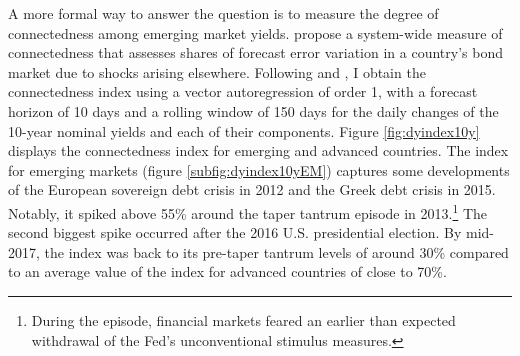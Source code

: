 {A more formal way to answer the question is to measure the degree of connectedness among emerging market yields.
\cite{DieboldYilmaz:2014} propose a system-wide measure of connectedness 
that assesses shares of forecast error variation in a country's bond market due to shocks arising elsewhere.
Following \cite{ACDM:2019} and \cite{BostanciYilmaz:2020}, I obtain the connectedness index using a vector autoregression of order 1, with a forecast horizon of 10 days and a rolling window of 150 days for the daily changes of the 10-year nominal yields 
and each of their components.
Figure \ref{fig:dyindex10y} displays the connectedness index for emerging and advanced countries.
The index for emerging markets (figure \ref{subfig:dyindex10yEM}) captures some developments of the European sovereign debt crisis in 2012 and  the Greek debt crisis in 2015.
Notably, it spiked above 55\% around the taper tantrum episode in 2013.\footnote{ During the episode, financial markets feared an earlier than expected withdrawal of the Fed's unconventional stimulus measures.} %
The second biggest spike %
occurred after the 2016 U.S. presidential election.
By mid-2017, the index was back to its pre-taper tantrum levels of around 30\% compared to an average value of the index for advanced countries of close to 70\%.

}
